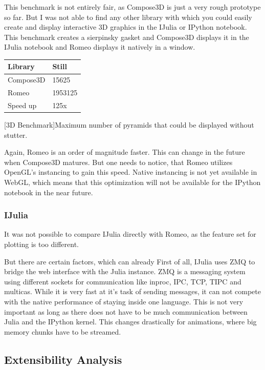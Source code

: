 This benchmark is not entirely fair, as Compose3D is just a very rough prototype so far. But I was not able to find any other library with which you could easily create and display interactive 3D graphics in the IJulia or IPython notebook. This benchmark creates a sierpinsky gasket and Compose3D displays it in the IJulia notebook and Romeo displays it natively in a window.

\begin{table}[htbp]
    \centering
    \begin{tabular}{l|l}
        \hline
        \textbf{Library} & \textbf{Still}\\ 
        \hline
        Compose3D        & 15625         \\
        Romeo            & 1953125       \\
        \hline
        \hline
        Speed up         & 125x          \\
    \end{tabular}
    [3D Benchmark]{Maximum number of pyramids that could be displayed without stutter.}
    \label{table:relativespeedoglw}
\end{table}
Again, Romeo is an order of magnitude faster. This can change in the future when Compose3D matures.
But one needs to notice, that Romeo utilizes OpenGL's instancing to gain this speed. Native instancing is not yet available in WebGL, which means that this optimization will not be available for the IPython notebook in the near future.


\subsubsection{IJulia}
It was not possible to compare IJulia directly with Romeo, as the feature set for plotting is too different.

But there are certain factors, which can already 
First of all, IJulia uses ZMQ to bridge the web interface with the Julia instance.
ZMQ is a messaging system using different sockets for communication like inproc, IPC, TCP, TIPC and multicas.
While it is very fast at it's task of sending messages, it can not compete with the native performance of staying inside one language.
This is not very important as long as there does not have to be much communication between Julia and the IPython kernel. This changes drastically for animations, where big memory chunks have to be streamed.


\subsection{Extensibility Analysis}

